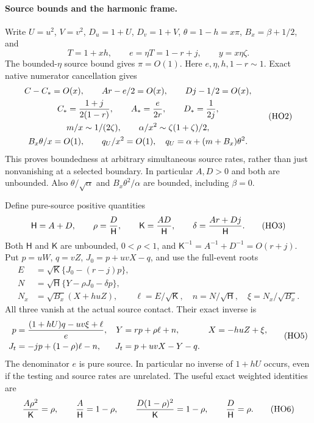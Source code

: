 \paragraph{Source bounds and the harmonic frame.}
Write $U=u^2$, $V=v^2$, $D_u=1+U$, $D_v=1+V$,
$\theta=1-h=x\pi$, $B_x=\beta+1/2$, and
\[
 T=1+xh,\qquad e=\eta T=1-r+j,\qquad y=x\eta\zeta .
 \tag{HO1}
\]
The bounded-$\eta$ source bound gives $\pi=O(1)$.
Here $e,\eta,h,1-r\sim1$. Exact native numerator cancellation gives
\[
 \begin{gathered}
 C-C_* =O(x),\qquad Ar-e/2=O(x),\qquad Dj-1/2=O(x),\\
 C_*={1+j\over2(1-r)},\qquad A_*={e\over2r},\qquad D_*={1\over2j},\\
 m/x\sim1/(2\zeta),\qquad
 \alpha/x^2\sim\zeta(1+\zeta)/2,\\
 B_x\theta/x=O(1),\qquad
 q_U/x^2=O(1),\quad q_U=\alpha+(m+B_x)\theta^2 .
 \end{gathered}
 \tag{HO2}
\]
 This proves boundedness at arbitrary simultaneous
source rates, rather than just nonvanishing at a selected boundary.
In particular $A,D>0$ and both are unbounded.
Also $\theta/\sqrt\alpha$ and $B_x\theta^2/\alpha$ are bounded,
including $\beta=0$.

Define pure-source positive quantities
\[
 \mathsf H=A+D,\qquad \rho={D\over\mathsf H},\qquad
 \mathsf K={AD\over\mathsf H},\qquad
 \delta={Ar+Dj\over\mathsf H}.
 \tag{HO3}
\]
Both $\mathsf H$ and $\mathsf K$ are unbounded,
$0<\rho<1$, and
$\mathsf K^{-1}=A^{-1}+D^{-1}=O(r+j)$.
Put $p=uW$, $q=vZ$, $J_0=p+uvX-q$, and use the full-event roots
\[
 \begin{aligned}
 E&=\sqrt{\mathsf K}\{J_0-(r-j)p\},\\
 N&=\sqrt{\mathsf H}\{Y-\rho J_0-\delta p\},\\
 N_x&=\sqrt{B_x}(X+huZ),\qquad
 \ell=E/\sqrt{\mathsf K},\quad n=N/\sqrt{\mathsf H},
 \quad \xi=N_x/\sqrt{B_x}.
 \end{aligned}
 \tag{HO4}
\]
All three vanish at the actual source contact. Their exact inverse is
\[
 \begin{aligned}
 p&={(1+hU)q-uv\xi+\ell\over e},&
 Y&=rp+\rho\ell+n,&X&=-huZ+\xi,\\
 J_t&=-jp+(1-\rho)\ell-n,&J_t&=p+uvX-Y-q .
 \end{aligned}
 \tag{HO5}
\]
The denominator $e$ is pure source. In particular no inverse of
$1+hU$ occurs, even if the testing and source rates are unrelated.
The useful exact weighted identities are
\[
 {A\rho^2\over\mathsf K}=\rho,\qquad
 {A\over\mathsf H}=1-\rho,\qquad
 {D(1-\rho)^2\over\mathsf K}=1-\rho,\qquad
 {D\over\mathsf H}=\rho .
 \tag{HO6}
\]

